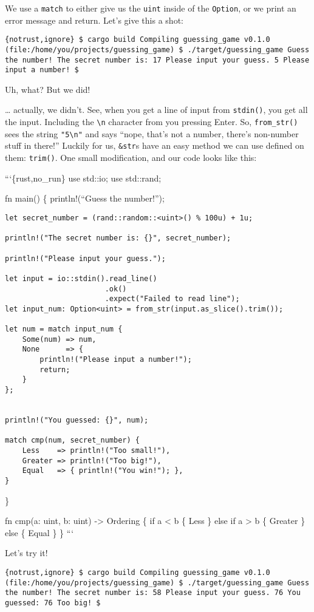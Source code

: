 \documentclass[]{article}
\begin{document}
We use a \texttt{match} to either give us the \texttt{uint} inside of
the \texttt{Option}, or we print an error message and return. Let's give
this a shot:

\texttt{\{notrust,ignore\} \$ cargo build    Compiling guessing\_game v0.1.0 (file:/home/you/projects/guessing\_game) \$ ./target/guessing\_game  Guess the number! The secret number is: 17 Please input your guess. 5 Please input a number! \$}

Uh, what? But we did!

\ldots{} actually, we didn't. See, when you get a line of input from
\texttt{stdin()}, you get all the input. Including the
\texttt{\textbackslash{}n} character from you pressing Enter. So,
\texttt{from\_str()} sees the string \texttt{"5\textbackslash{}n"} and
says ``nope, that's not a number, there's non-number stuff in there!''
Luckily for us, \texttt{\&str}s have an easy method we can use defined
on them: \texttt{trim()}. One small modification, and our code looks
like this:

```\{rust,no\_run\} use std::io; use std::rand;

fn main() \{ println!(``Guess the number!'');

\begin{verbatim}
let secret_number = (rand::random::<uint>() % 100u) + 1u;

println!("The secret number is: {}", secret_number);

println!("Please input your guess.");

let input = io::stdin().read_line()
                       .ok()
                       .expect("Failed to read line");
let input_num: Option<uint> = from_str(input.as_slice().trim());

let num = match input_num {
    Some(num) => num,
    None      => {
        println!("Please input a number!");
        return;
    }
};


println!("You guessed: {}", num);

match cmp(num, secret_number) {
    Less    => println!("Too small!"),
    Greater => println!("Too big!"),
    Equal   => { println!("You win!"); },
}
\end{verbatim}

\}

fn cmp(a: uint, b: uint) -\textgreater{} Ordering \{ if a \textless{} b
\{ Less \} else if a \textgreater{} b \{ Greater \} else \{ Equal \} \}
```

Let's try it!

\texttt{\{notrust,ignore\} \$ cargo build    Compiling guessing\_game v0.1.0 (file:/home/you/projects/guessing\_game) \$ ./target/guessing\_game  Guess the number! The secret number is: 58 Please input your guess.   76   You guessed: 76 Too big! \$}
\end{document}
